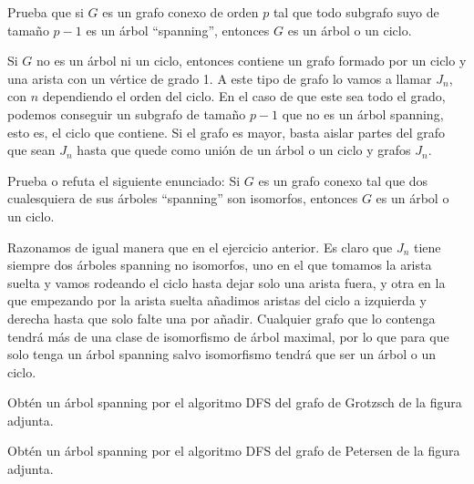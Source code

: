 \documentclass[twoside]{article}
\begin{document}
\newpage

\begin{ejercicio}{1.6}
Prueba que si $G$ es un grafo conexo de orden $p$ tal que todo subgrafo suyo de tamaño
$p -1$ es un árbol ``spanning'', entonces $G$ es un árbol o un ciclo.
\end{ejercicio}
\begin{solucion}
Si $G$ no es un árbol ni un ciclo, entonces contiene un grafo formado por un ciclo y una arista  con un vértice de grado 1. A este tipo de grafo lo vamos a llamar $J_n$, con $n$ dependiendo el orden del ciclo. En el caso de que este sea todo el grado, podemos conseguir un subgrafo de tamaño $p-1$ que no es un árbol spanning, esto es, el ciclo que contiene. Si el grafo es mayor, basta aislar partes del grafo que sean $J_n$ hasta que quede como unión de un árbol o un ciclo y grafos $J_n$.
\end{solucion}

\newpage

\begin{ejercicio}{1.7}
Prueba o refuta el siguiente enunciado: Si $G$ es un grafo conexo tal que dos cualesquiera
de sus árboles ``spanning'' son isomorfos, entonces $G$ es un árbol o un ciclo.
\end{ejercicio}
\begin{solucion}
Razonamos de igual manera que en el ejercicio anterior. Es claro que $J_n$ tiene siempre dos árboles spanning no isomorfos, uno en el que tomamos la arista suelta y vamos rodeando el ciclo hasta dejar solo una arista fuera, y otra en la que empezando por la arista suelta añadimos aristas del ciclo a izquierda y derecha hasta que solo falte una por añadir. Cualquier grafo que lo contenga tendrá más de una clase de isomorfismo de árbol maximal, por lo que para que solo tenga un árbol spanning salvo isomorfismo tendrá que ser un árbol o un ciclo. 
\end{solucion}

\newpage

\begin{ejercicio}{1.8}
Obtén un árbol spanning por el algoritmo DFS del grafo de Grotzsch de la figura adjunta.
\end{ejercicio}
\begin{solucion}





\end{solucion}
\newpage

\begin{ejercicio}{1.9}
Obtén un árbol spanning por el algoritmo DFS del grafo de Petersen de la figura adjunta.
\end{ejercicio}
\begin{solucion}

\end{solucion}
\newpage
\end{document}
